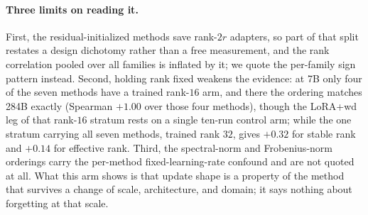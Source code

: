 \documentclass[11pt]{article}
\begin{document}
\paragraph{Three limits on reading it.} First, the residual-initialized
methods save rank-$2r$ adapters, so part of that split restates a design
dichotomy rather than a free measurement, and the rank correlation pooled over
all families is inflated by it; we quote the per-family sign pattern instead.
Second, holding rank fixed weakens the evidence: at 7B only four of the seven
methods have a trained rank-$16$ arm, and there the ordering matches 284B
exactly (Spearman $+1.00$ over those four methods), though the LoRA{+}wd leg of
that rank-$16$ stratum rests on a single ten-run control arm; while the one stratum
carrying all seven methods, trained rank $32$, gives $+0.32$ for stable rank
and $+0.14$ for effective rank. Third, the spectral-norm and Frobenius-norm
orderings carry the per-method fixed-learning-rate confound and are not
quoted at all. What this arm shows is that update shape is a property of the
method that survives a change of scale, architecture, and domain; it says
nothing about forgetting at that scale.

\begin{table}[t]
\centering\footnotesize
\setlength{\tabcolsep}{4pt}
\caption{The 284B arm: per-method means over the available seeds. Update-shape
geometry is computed from the saved adapters; MedMCQA accuracy comes from the
training-time logs, a single source. The stable-rank fingerprint recurs across
scale; no retention measurement exists at 284B (Limitations).}
\label{tab:ds284b}
\end{table}
\end{document}
